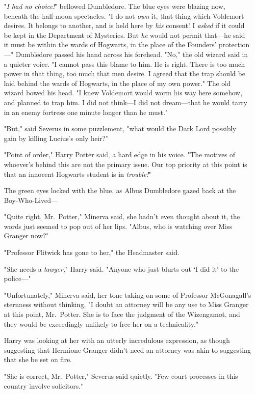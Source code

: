 "\emph{I had no choice!}" bellowed Dumbledore. The blue eyes were blazing now,
beneath the half-moon spectacles. "I do not \emph{own} it, that thing which
Voldemort desires. It belongs to another, and is held here by \emph{his}
consent! I \emph{asked} if it could be kept in the Department of Mysteries. But
\emph{he} would not permit that---he said it must be within the wards of
Hogwarts, in the place of the Founders' protection---" Dumbledore passed his
hand across his forehead. "No," the old wizard said in a quieter voice. "I
cannot pass this blame to him. He is right. There is too much power in that
thing, too much that men desire. I agreed that the trap should be laid behind
the wards of Hogwarts, in the place of my own power." The old wizard bowed his
head. "I knew Voldemort would worm his way here somehow, and planned to trap
him. I did not think---I did not dream---that he would tarry in an enemy
fortress one minute longer than he must."

"But," said Severus in some puzzlement, "what would the Dark Lord possibly gain
by killing Lucius's only heir?"

"Point of order," Harry Potter said, a hard edge in his voice. "The motives of
whoever's behind this are not the primary issue. Our top priority at this point
is that an innocent Hogwarts student is in \emph{trouble!}"

The green eyes locked with the blue, as Albus Dumbledore gazed back at the
Boy-Who-Lived---

"Quite right, Mr.~Potter," Minerva said, she hadn't even thought about it, the
words just seemed to pop out of her lips. "Albus, who is watching over Miss
Granger now?"

"Professor Flitwick has gone to her," the Headmaster said.

"She needs a \emph{lawyer,}" Harry said. "Anyone who just blurts out `I did it'
to the police---"

"Unfortunately," Minerva said, her tone taking on some of Professor
McGonagall's sternness without thinking, "I doubt an attorney will be any use
to Miss Granger at this point, Mr.~Potter. She is to face the judgment of the
Wizengamot, and they would be exceedingly unlikely to free her on a
technicality."

Harry was looking at her with an utterly incredulous expression, as though
suggesting that Hermione Granger didn't need an attorney was akin to suggesting
that she be set on fire.

"She is correct, Mr.~Potter," Severus said quietly. "Few court processes in
this country involve solicitors."

